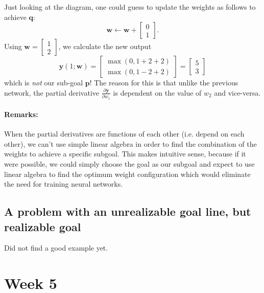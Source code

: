 \documentclass{article}
\renewcommand\vec{\mathbf}
\begin{document}
Just looking at the diagram, one could guess to update the weights as follows to achieve $\vec{q}$:
\begin{equation*}
    \vec{w} \leftarrow \vec{w} +
    \begin{bmatrix}
        0 \\
        1
    \end{bmatrix}.
\end{equation*}
Using $\vec{w} = \begin{bmatrix} 1 \\ 2 \end{bmatrix}$, we calculate the new output
\begin{equation*}
    \vec{y}(1; \vec{w})
    = 
    \begin{bmatrix}
        \max \left( 0, 1 + 2 + 2 \right) \\
        \max \left( 0, 1 - 2 + 2 \right)
    \end{bmatrix}
    =
    \begin{bmatrix}
        5 \\
        3
    \end{bmatrix}
\end{equation*}
which is \textit{not} our sub-goal $\vec{p}$! The reason for this is that unlike the previous network, the partial derivative $\frac{\partial \vec{y}}{\partial w_1}$ is dependent on the value of $w_2$ and vice-versa.

\paragraph{Remarks:}
When the partial derivatives are functions of each other (i.e. depend on each other), we can't use simple linear algebra in order to find the combination of the weights to achieve a specific subgoal. 
This makes intuitive sense, because if it were possible, we could simply choose the goal as our subgoal and expect to use linear algebra to find the optimum weight configuration which would eliminate the need for training neural networks.

\subsection{A problem with an unrealizable goal line, but realizable goal}
Did not find a good example yet.


\section{Week 5}
\end{document}

